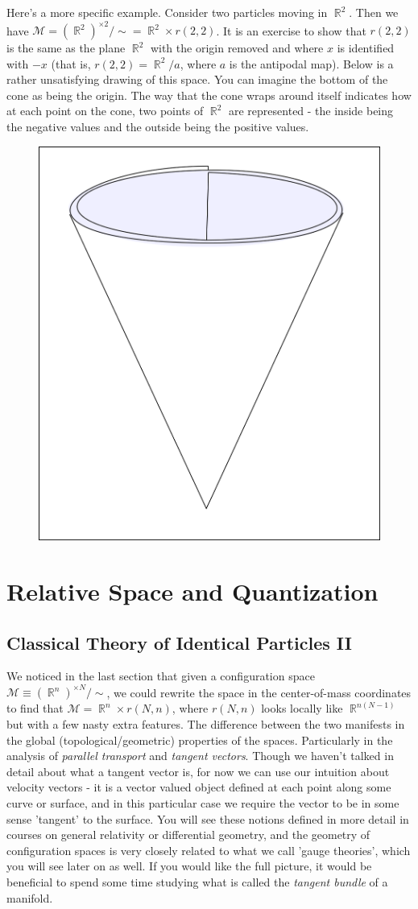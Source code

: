 \documentclass{article}
\DeclareMathOperator{\RR}{\mathbb{R}}
\begin{document}
Here's a more specific example. Consider two particles moving in $\RR^2$. Then we have $\mathcal{M} = (\RR^2)^{\times 2}/\sim = \RR^2 \times r(2,2)$. It is an exercise to show that $r(2,2)$ is the same as the plane $\RR^2$ with the origin removed and where $x$ is identified with $-x$ (that is, $r(2,2) = \RR^2 / a$, where $a$ is the antipodal map). Below is a rather unsatisfying drawing of this space. You can imagine the bottom of the cone as being the origin. The way that the cone wraps around itself indicates how at each point on the cone, two points of $\RR^2$ are represented - the inside being the negative values and the outside being the positive values.
\begin{figure}[ht]
    \centering
    \includegraphics[width=0.5\linewidth]{Figures/rp1.png}
    \caption*{}
    \label{fig:my_label}
\end{figure}
\pagebreak
\section{Relative Space and Quantization}
\subsection{Classical Theory of Identical Particles II}
We noticed in the last section that given a configuration space $\mathcal{M} \equiv (\RR^n)^{\times N}/\sim$, we could rewrite the space in the center-of-mass coordinates to find that $\mathcal{M} = \RR^n \times r(N,n)$, where $r(N,n)$ looks locally like $\RR^{n(N-1)}$ but with a few nasty extra features. The difference between the two manifests in the global (topological/geometric) properties of the spaces. Particularly in the analysis of \textit{parallel transport} and \textit{tangent vectors}. Though we haven't talked in detail about what a tangent vector is, for now we can use our intuition about velocity vectors - it is a vector valued object defined at each point along some curve or surface, and in this particular case we require the vector to be in some sense 'tangent' to the surface. You will see these notions defined in more detail in courses on general relativity or differential geometry, and the geometry of configuration spaces is very closely related to what we call 'gauge theories', which you will see later on as well. If you would like the full picture, it would be beneficial to spend some time studying what is called the \textit{tangent bundle} of a manifold.
\end{document}
